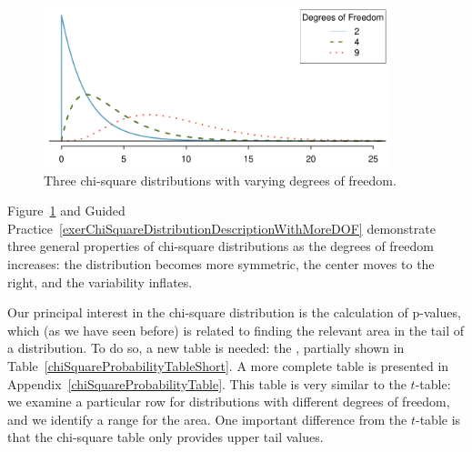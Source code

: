 \begin{figure}[h]
\centering
\includegraphics[width=0.9\textwidth]{ch_inference_for_props/figures/chiSquareDistributionWithInceasingDF/chiSquareDistributionWithInceasingDF}
\caption{Three chi-square distributions with varying degrees of freedom.}
\label{chiSquareDistributionWithInceasingDF}
\end{figure}

Figure~\ref{chiSquareDistributionWithInceasingDF} and Guided Practice~\ref{exerChiSquareDistributionDescriptionWithMoreDOF} demonstrate three general properties of chi-square distributions as the degrees of freedom increases: the distribution becomes more symmetric, the center moves to the right, and the variability inflates.

Our principal interest in the chi-square distribution is the calculation of p-values, which (as we have seen before) is related to finding the relevant area in the tail of a distribution. To do so, a new table is needed: the , partially shown in Table~\ref{chiSquareProbabilityTableShort}. A more complete table is presented in Appendix~\vref{chiSquareProbabilityTable}. This table is very similar to the $t$-table: we examine a particular row for distributions with different degrees of freedom, and we identify a range for the area. One important difference from the $t$-table is that the chi-square table only provides upper tail values.

